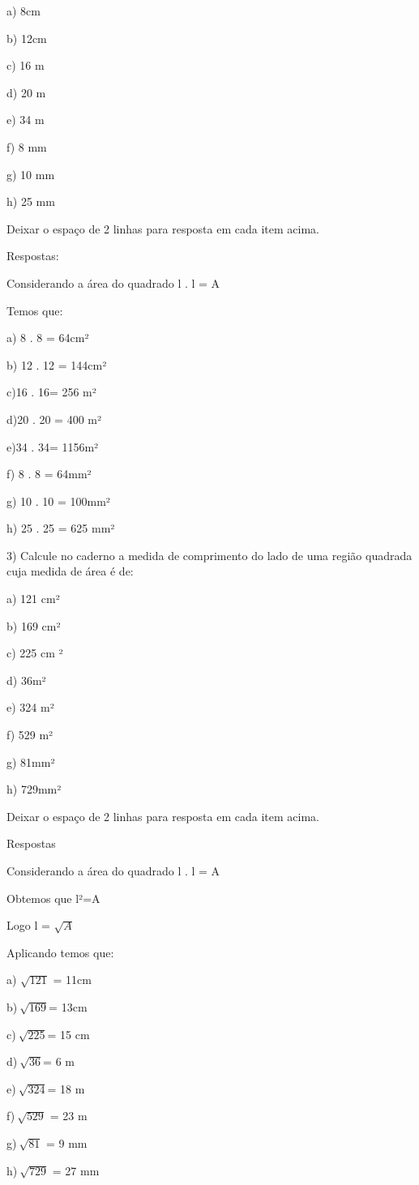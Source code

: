 {a) 8cm

b) 12cm

c) 16 m

d) 20 m

e) 34 m

f) 8 mm

g) 10 mm

h) 25 mm

Deixar o espaço de 2 linhas para resposta em cada item acima.

Respostas:

Considerando a área do quadrado l . l = A

Temos que:

a) 8 . 8 = 64cm²

b) 12 . 12 = 144cm²

c)16 . 16= 256 m²

d)20 . 20 = 400 m²

e)34 . 34= 1156m²

f) 8 . 8 = 64mm²

g) 10 . 10 = 100mm²

h) 25 . 25 = 625 mm²

3) Calcule no caderno a medida de comprimento do lado de uma região
quadrada cuja medida de área é de:

a) 121 cm²

b) 169 cm²

c) 225 cm ²

d) 36m²

e) 324 m²

f) 529 m²

g) 81mm²

h) 729mm²

Deixar o espaço de 2 linhas para resposta em cada item acima.

Respostas

Considerando a área do quadrado l . l = A

Obtemos que l²=A

Logo l = \(\sqrt{A}\)

Aplicando temos que:

a) \(\sqrt{121}\) = 11cm

b)\(\ \sqrt{169}\)= 13cm

c)\(\ \sqrt{225}\)= 15 cm

d)\(\ \sqrt{36}\)= 6 m

e)\(\ \sqrt{324}\)= 18 m

f)\(\ \sqrt{529}\) = 23 m

g)\(\ \sqrt{81}\) = 9 mm

h)\(\ \sqrt{729}\) = 27 mm

}
